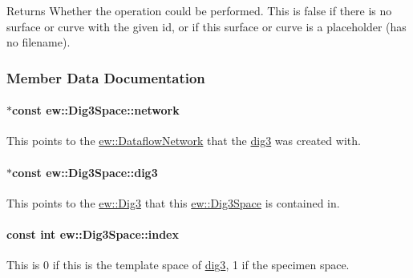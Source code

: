 \begin{DoxyReturn}{Returns}
Whether the operation could be performed. This is false if there is no surface or curve with the given id, or if this surface or curve is a placeholder (has no filename). 
\end{DoxyReturn}


\subsubsection{Member Data Documentation}
\hypertarget{classew_1_1Dig3Space_a9b0b4fe232f986990d036782ada68b7d}{
\paragraph[{network}]{ $\ast$const {\bf ew::Dig3Space::network}}\hfill}
\label{classew_1_1Dig3Space_a9b0b4fe232f986990d036782ada68b7d}
This points to the \hyperlink{classew_1_1DataflowNetwork}{ew::DataflowNetwork} that the \hyperlink{classew_1_1Dig3Space_adb69ce686a3d16df25a616a70ac82b7b}{dig3} was created with. \hypertarget{classew_1_1Dig3Space_adb69ce686a3d16df25a616a70ac82b7b}{
\paragraph[{dig3}]{ $\ast$const {\bf ew::Dig3Space::dig3}}\hfill}
\label{classew_1_1Dig3Space_adb69ce686a3d16df25a616a70ac82b7b}
This points to the \hyperlink{classew_1_1Dig3}{ew::Dig3} that this \hyperlink{classew_1_1Dig3Space}{ew::Dig3Space} is contained in. \hypertarget{classew_1_1Dig3Space_a00176cf8f95e7fe1ef6c0530f332ba7c}{
\paragraph[{index}]{\setlength{\rightskip}{0pt plus 5cm}const int {\bf ew::Dig3Space::index}}\hfill}
\label{classew_1_1Dig3Space_a00176cf8f95e7fe1ef6c0530f332ba7c}
This is 0 if this is the template space of \hyperlink{classew_1_1Dig3Space_adb69ce686a3d16df25a616a70ac82b7b}{dig3}, 1 if the specimen space. 